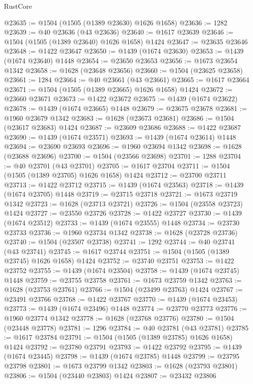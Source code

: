 \begin{lexlean}{RustCore}
\begin{coremodule}
@23635 := @1504 (@1505 (@1389 @23630) @1626 @1658)
@23636 := 1282
@23639 := @40 @23636 (@43 @23636)
@23640 := @1617 @23639
@23646 := @1504 (@1505 (@1389 @23640) @1626 @1658) @1424
@23647 := @23635 @23646
@23648 := @1422 @23647
@23650 := @1439 (@1674 @23630)
@23653 := @1439 (@1674 @23640) @1448
@23654 := @23650 @23653
@23656 := @1673 @23654 @1342
@23658 := @1628 (@23648 @23656)
@23660 := @1504 (@23625 @23658)
@23661 := 1284
@23664 := @40 @23661 (@43 @23661)
@23665 := @1617 @23664
@23671 := @1504 (@1505 (@1389 @23665) @1626 @1658) @1424
@23672 := @23660 @23671
@23673 := @1422 @23672
@23675 := @1439 (@1674 @23622)
@23678 := @1439 (@1674 @23665) @1448
@23679 := @23675 @23678
@23681 := @1960 @23679 @1342
@23683 := @1628 (@23673 @23681)
@23686 := @1504 (@23617 @23683) @1424
@23687 := @23609 @23686
@23688 := @1422 @23687
@23690 := @1439 (@1674 @23571)
@23693 := @1439 (@1674 @23614) @1448
@23694 := @23690 @23693
@23696 := @1960 @23694 @1342
@23698 := @1628 (@23688 @23696)
@23700 := @1504 (@23566 @23698)
@23701 := 1288
@23704 := @40 @23701 (@43 @23701)
@23705 := @1617 @23704
@23711 := @1504 (@1505 (@1389 @23705) @1626 @1658) @1424
@23712 := @23700 @23711
@23713 := @1422 @23712
@23715 := @1439 (@1674 @23563)
@23718 := @1439 (@1674 @23705) @1448
@23719 := @23715 @23718
@23721 := @1673 @23719 @1342
@23723 := @1628 (@23713 @23721)
@23726 := @1504 (@23558 @23723) @1424
@23727 := @23550 @23726
@23728 := @1422 @23727
@23730 := @1439 (@1674 @23512)
@23733 := @1439 (@1674 @23555) @1448
@23734 := @23730 @23733
@23736 := @1960 @23734 @1342
@23738 := @1628 (@23728 @23736)
@23740 := @1504 (@23507 @23738)
@23741 := 1292
@23744 := @40 @23741 (@43 @23741)
@23745 := @1617 @23744
@23751 := @1504 (@1505 (@1389 @23745) @1626 @1658) @1424
@23752 := @23740 @23751
@23753 := @1422 @23752
@23755 := @1439 (@1674 @23504)
@23758 := @1439 (@1674 @23745) @1448
@23759 := @23755 @23758
@23761 := @1673 @23759 @1342
@23763 := @1628 (@23753 @23761)
@23766 := @1504 (@23499 @23763) @1424
@23767 := @23491 @23766
@23768 := @1422 @23767
@23770 := @1439 (@1674 @23453)
@23773 := @1439 (@1674 @23496) @1448
@23774 := @23770 @23773
@23776 := @1960 @23774 @1342
@23778 := @1628 (@23768 @23776)
@23780 := @1504 (@23448 @23778)
@23781 := 1296
@23784 := @40 @23781 (@43 @23781)
@23785 := @1617 @23784
@23791 := @1504 (@1505 (@1389 @23785) @1626 @1658) @1424
@23792 := @23780 @23791
@23793 := @1422 @23792
@23795 := @1439 (@1674 @23445)
@23798 := @1439 (@1674 @23785) @1448
@23799 := @23795 @23798
@23801 := @1673 @23799 @1342
@23803 := @1628 (@23793 @23801)
@23806 := @1504 (@23440 @23803) @1424
@23807 := @23432 @23806

\end{coremodule}
\end{lexlean}
